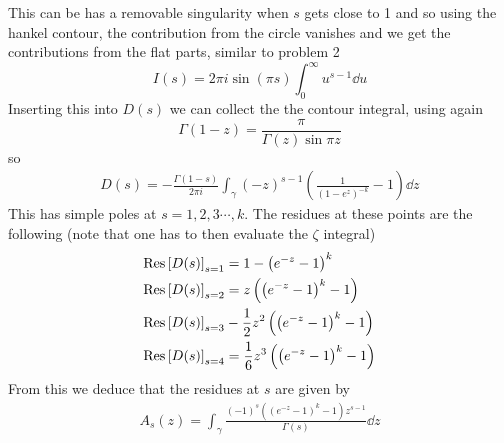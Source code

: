 \documentclass[a4paper,12pt]{article}
\begin{document}
This can be has a removable singularity when $s$ gets close to 1 and so using the hankel contour, the contribution from the circle vanishes and we get the contributions from the flat parts, similar to problem 2
\begin{equation}
I(s)=2\pi i\sin(\pi s)\int_{0}^{\infty}u^{s-1}	\dd u
\end{equation}
Inserting this into $D(s)$ we can collect the the contour integral, using again
\begin{equation}
	\Gamma(1-z)=\frac{\pi}{\Gamma(z)\sin \pi z}
\end{equation}
so 
\begin{equation}
	\begin{aligned}
D(s)=-\frac{\Gamma(1-s)}{2\pi i}\int_\gamma
 (-z)^{s-1}\left(\frac{1}{(1-e^{z})^{-k}}-1\right) \dd z
	\end{aligned}
\end{equation}
This has simple poles at $s=1,2,3\cdots,k$. The residues at these points are the following (note that one has to then evaluate the $\zeta$ integral)
\begin{equation}
	\begin{aligned}
		\Res \left[D(s)\right]_{s=1}&=1-\left(e^{-z}-1\right)^k\\
		\Res \left[D(s)\right]_{s=2}&=z \left(\left(e^{-z}-1\right)^k-1\right)\\
		\Res \left[D(s)\right]_{s=3}&-\frac{1}{2} z^2 \left(\left(e^{-z}-1\right)^k-1\right)\\
		\Res \left[D(s)\right]_{s=4}&=\frac{1}{6} z^3 \left(\left(e^{-z}-1\right)^k-1\right)
	\end{aligned}
\end{equation}
From this we deduce that the residues at $s$ are given by
\begin{equation}
	\begin{aligned}
		A_s(z)=\int_\gamma\frac{(-1)^s \left(\left(e^{-z}-1\right)^k-1\right) z^{s-1}}{\Gamma (s)}\dd z
	\end{aligned}
\end{equation}
\end{document}
